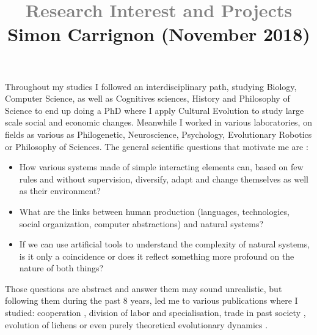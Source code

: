 \documentclass[10pt]{article}
\title{\textcolor{grey}{\Large Research Interest and Projects}\\
\vspace{-.25cm}
{ \normalsize Simon Carrignon (November 2018)}}
\author{}
\date{}
\begin{document}
\maketitle

\vspace{-.5cm}

Throughout my studies I followed an interdisciplinary path, studying Biology, Computer Science, as well as Cognitives sciences, History and Philosophy of Science to end up doing a PhD where I apply Cultural Evolution to study large scale social and economic changes. Meanwhile I worked  in various laboratories, on fields as various as Philogenetic, Neuroscience, Psychology, Evolutionary Robotics or Philosophy of Sciences. The general scientific questions that motivate me are : 
\begin{itemize}
    \item How various systems made of simple interacting elements can, based on few rules and without supervision, diversify, adapt and change themselves as well as their environment?
    \item What are the links between human production (languages, technologies, social organization, computer abstractions) and natural systems? 
    \item If we can use artificial tools to understand the complexity of natural systems, is it only a coincidence or does it reflect something more profound on the nature of both things?
\end{itemize}
Those questions are abstract and answer them may sound unrealistic, but following them during the past 8 years, led me to various publications where I studied: cooperation \cite{zibetti2015acaciaesanagentbasedmodelingandsimulationtoolforinvestigatingsocialbehaviorsinresourcelimitedtwodimensionalenvironments}, division of labor and specialisation\cite{montanier2016behavioralspecializationinembodiedevolutionaryroboticswhysodifficult,bredeche2017benefitsofproportionateselectioninembodiedevolutionacasestudywithbehaviouralspecialization}, trade in past society \cite{carrignon2015modelingthecoevolutionoftradeandcultureinpastsocieties}, evolution of lichens \cite{carrignon2016lichen} or even purely theoretical evolutionary dynamics \cite{medernach2015evolutionary,medernach2016evolution}.
\end{document}
